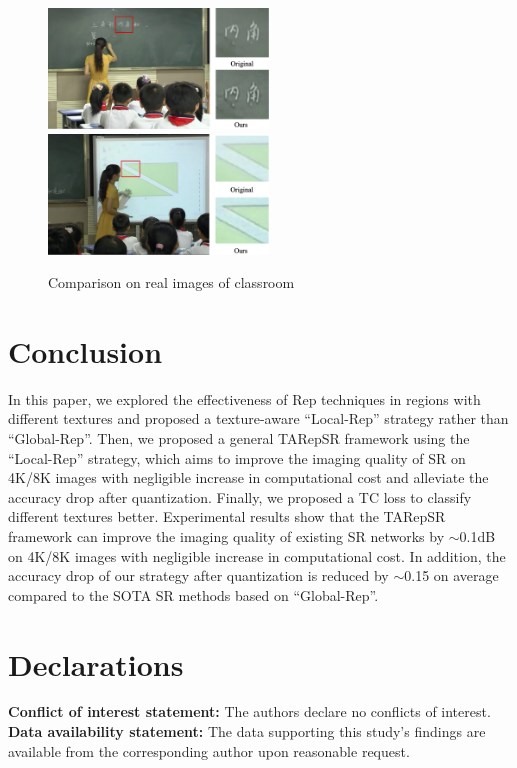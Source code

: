 \documentclass[sn-mathphys]{sn-jnl}%
\theoremstyle{thmstyleone}%
\theoremstyle{thmstyletwo}%
\theoremstyle{thmstylethree}%
\begin{document}
\begin{figure}
    \centering
    \includegraphics[width=2.3in]{65147_contrast.png}
    \includegraphics[width=2.3in]{65305_contrast.png}
    \caption{Comparison on real images of classroom}
    \label{real-images}
\end{figure}

\section{Conclusion}
In this paper, we explored the effectiveness of Rep techniques in regions with different textures and proposed a texture-aware ``Local-Rep'' strategy rather than ``Global-Rep''. Then, we proposed a general TARepSR framework using the ``Local-Rep'' strategy, which aims to improve the imaging quality of SR on 4K/8K images with negligible increase in computational cost and alleviate the accuracy drop after quantization. Finally, we proposed a TC loss to classify different textures better. Experimental results show that the TARepSR framework can improve the imaging quality of existing SR networks by $\sim$0.1dB on 4K/8K images with negligible increase in computational cost. In addition, the accuracy drop of our strategy after quantization is reduced by $\sim$0.15 on average compared to the SOTA SR methods based on ``Global-Rep''.

\section*{Declarations}
\textbf{Conflict of interest statement:} The authors declare no conflicts of interest.
\textbf{Data availability statement:} The data supporting this study's findings are available from the corresponding author upon reasonable request.


\end{document}
